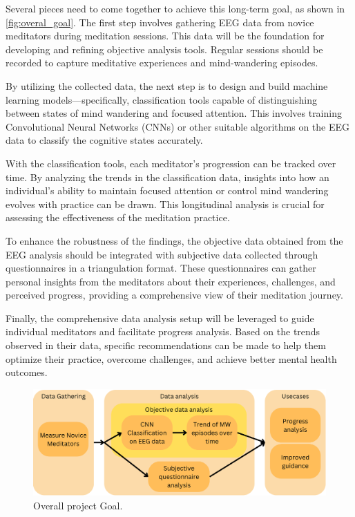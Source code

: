 Several pieces need to come together to achieve this long-term goal, as shown in \autoref{fig:overal_goal}.
The first step involves gathering EEG data from novice meditators during meditation sessions. This data will be the foundation for developing and refining objective analysis tools. Regular sessions should be recorded to capture meditative experiences and mind-wandering episodes.

By utilizing the collected data, the next step is to design and build machine learning models—specifically, classification tools capable of distinguishing between states of mind wandering and focused attention. This involves training Convolutional Neural Networks (CNNs) or other suitable algorithms on the EEG data to classify the cognitive states accurately.

With the classification tools, each meditator's progression can be tracked over time. By analyzing the trends in the classification data, insights into how an individual's ability to maintain focused attention or control mind wandering evolves with practice can be drawn. This longitudinal analysis is crucial for assessing the effectiveness of the meditation practice.

To enhance the robustness of the findings, the objective data obtained from the EEG analysis should be integrated with subjective data collected through questionnaires in a triangulation format. These questionnaires can gather personal insights from the meditators about their experiences, challenges, and perceived progress, providing a comprehensive view of their meditation journey.

Finally, the comprehensive data analysis setup will be leveraged to guide individual meditators and facilitate progress analysis. Based on the trends observed in their data, specific recommendations can be made to help them optimize their practice, overcome challenges, and achieve better mental health outcomes.

\begin{figure}[H]
    \centering
    \hspace*{-2cm} 
    \includegraphics[width=500px]{Figures/project_flow.png}
    \caption{Overall project Goal.}
    \label{fig:overal_goal}
\end{figure}

